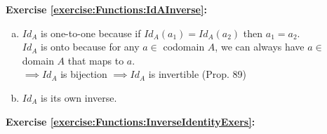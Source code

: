 \noindent\textbf{Exercise \ref{exercise:Functions:IdAInverse}:}
\begin{enumerate}[(a)]
\item
$Id_A$ is one-to-one because if $Id_A(a_1)=Id_A(a_2)$ then $a_1=a_2$.\\
$Id_A$ is onto because for any $a\in$ codomain $A$, we can always have $a\in$ domain $A$ that maps to $a$.\\
$\implies Id_A$ is bijection $\implies Id_A$ is invertible (Prop. 89)

\item
$Id_A$ is its own inverse.
\end{enumerate}

\noindent\textbf{Exercise \ref{exercise:Functions:InverseIdentityExers}:} %
